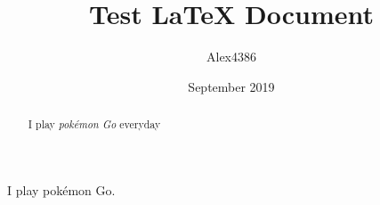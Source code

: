 \documentclass[12pt, letterpaper]{article}
\title{Test LaTeX Document}
\author{Alex4386}
\date{September 2019}
\begin{document}
\maketitle

\begin{abstract}
I play \emph{pokémon Go} everyday
\end{abstract}

I play pokémon Go.
\end{document}
